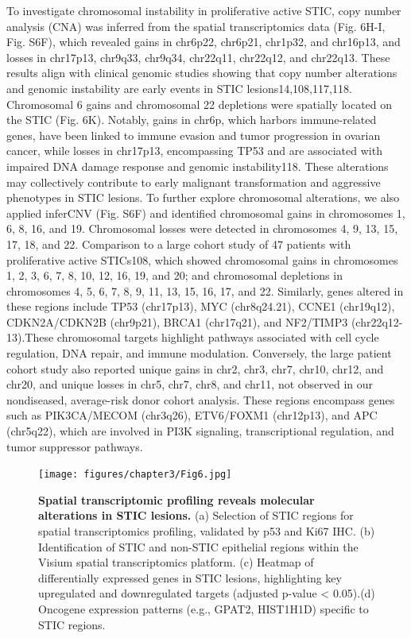 \begin{refsection}
    To investigate chromosomal instability in proliferative active STIC, copy number analysis (CNA) was inferred from the spatial transcriptomics data (Fig. 6H-I, Fig. S6F), which revealed gains in chr6p22, chr6p21, chr1p32, and chr16p13, and losses in chr17p13, chr9q33, chr9q34, chr22q11, chr22q12, and chr22q13. These results align with clinical genomic studies showing that copy number alterations and genomic instability are early events in STIC lesions14,108,117,118. Chromosomal 6 gains and chromosomal 22 depletions were spatially located on the STIC (Fig. 6K). Notably, gains in chr6p, which harbors immune-related genes, have been linked to immune evasion and tumor progression in ovarian cancer, while losses in chr17p13, encompassing TP53 and are associated with impaired DNA damage response and genomic instability118. These alterations may collectively contribute to early malignant transformation and aggressive phenotypes in STIC lesions. 
    To further explore chromosomal alterations, we also applied inferCNV (Fig. S6F) and identified chromosomal gains in chromosomes 1, 6, 8, 16, and 19. Chromosomal losses were detected in chromosomes 4, 9, 13, 15, 17, 18, and 22.  Comparison to a large cohort study of 47 patients with proliferative active STICs108, which showed chromosomal gains in chromosomes 1, 2, 3, 6, 7, 8, 10, 12, 16, 19, and 20; and chromosomal depletions in chromosomes 4, 5, 6, 7, 8, 9, 11, 13, 15, 16, 17, and 22. Similarly, genes altered in these regions include TP53 (chr17p13), MYC (chr8q24.21), CCNE1 (chr19q12), CDKN2A/CDKN2B (chr9p21), BRCA1 (chr17q21), and NF2/TIMP3 (chr22q12-13).These chromosomal targets highlight pathways associated with cell cycle regulation, DNA repair, and immune modulation. Conversely, the large patient cohort study also reported unique gains in chr2, chr3, chr7, chr10, chr12, and chr20, and unique losses in chr5, chr7, chr8, and chr11, not observed in our nondiseased, average-risk donor cohort analysis. These regions encompass genes such as PIK3CA/MECOM (chr3q26), ETV6/FOXM1 (chr12p13), and APC (chr5q22), which are involved in PI3K signaling, transcriptional regulation, and tumor suppressor pathways. 

    \begin{figure}[p]
        \begin{center}
            \texttt{[image: figures/chapter3/Fig6.jpg]}
            \captionsetup{font=small}
            \caption{\textbf{ Spatial transcriptomic profiling reveals molecular alterations in STIC lesions.} (a) Selection of STIC regions for spatial transcriptomics profiling, validated by p53 and Ki67 IHC. (b) Identification of STIC and non-STIC epithelial regions within the Visium spatial transcriptomics platform. (c) Heatmap of differentially expressed genes in STIC lesions, highlighting key upregulated and downregulated targets (adjusted p-value < 0.05).(d) Oncogene expression patterns (e.g., GPAT2, HIST1H1D) specific to STIC regions. }
            \label{chapter3_fig6}
        \end{center}
    \end{figure}
    

\end{refsection}
